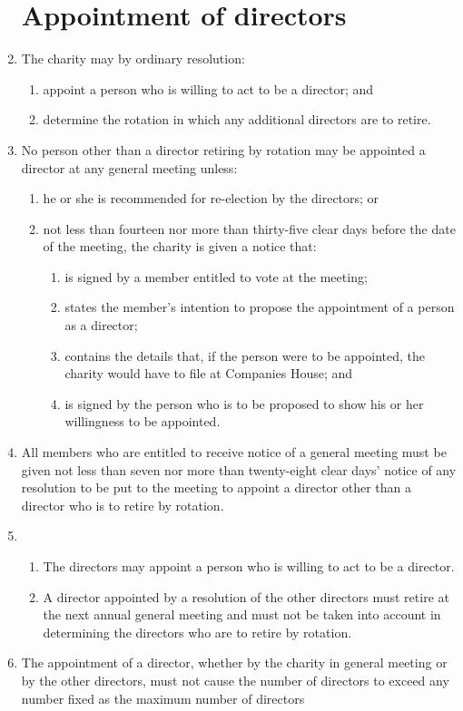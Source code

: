 \documentclass{article}
\begin{document}
\begin{enumerate}[label=\arabic*, start=23]
    \section{Appointment of directors}
    \item  The charity may by ordinary resolution:
    \begin{enumerate}[label=(\arabic*)]
    \item  appoint a person who is willing to act to be a director; and
    \item  determine the rotation in which any additional directors are
    to retire.
    \end{enumerate}
    \item No person other than a director retiring by rotation may be appointed a
    director at any general meeting unless:
    \begin{enumerate}[label=(\arabic*)]
        \item he or she is recommended for re-election by the directors; or
        \item not less than fourteen nor more than thirty-five clear days
        before the date of the meeting, the charity is given a
        notice that:
        \begin{enumerate}[label=(\alph*)]
            \item is signed by a member entitled to vote at the meeting;
            \item states the member’s intention to propose the
            appointment of a person as a director;
            \item contains the details that, if the person were to be
            appointed, the charity would have to file at Companies
            House; and
            \item is signed by the person who is to be proposed to show his
            or her willingness to be appointed.
        \end{enumerate}
    \end{enumerate}
    \item All members who are entitled to receive notice of a general meeting
    must be given not less than seven nor more than twenty-eight clear
    days’ notice of any resolution to be put to the meeting to appoint a
    director other than a director who is to retire by rotation.
    \item \begin{enumerate}[label=(\arabic*)]
        \item The directors may appoint a person who is willing to act to be
        a director.
       \item A director appointed by a resolution of the other directors must
        retire at the next annual general meeting and must not be
        taken into account in determining the directors who are to retire
        by rotation.
    \end{enumerate}
    \item The appointment of a director, whether by the charity in general
    meeting or by the other directors, must not cause the number of
    directors to exceed any number fixed as the maximum number
    of directors
    

\end{enumerate}
\end{document}
